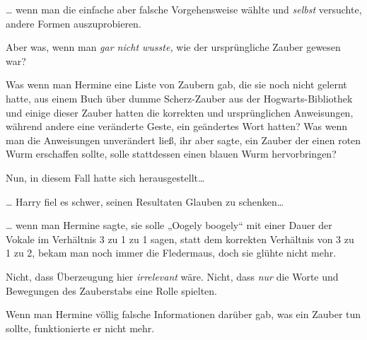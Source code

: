 … wenn man die einfache aber falsche Vorgehensweise wählte und \emph{selbst} versuchte, andere Formen auszuprobieren.

Aber was, wenn man \emph{gar nicht wusste,} wie der ursprüngliche Zauber gewesen war?

Was wenn man Hermine eine Liste von Zaubern gab, die sie noch nicht gelernt hatte, aus einem Buch über dumme Scherz-Zauber aus der Hogwarts-Bibliothek und einige dieser Zauber hatten die korrekten und ursprünglichen Anweisungen, während andere eine veränderte Geste, ein geändertes Wort hatten? Was wenn man die Anweisungen unverändert ließ, ihr aber sagte, ein Zauber der einen roten Wurm erschaffen sollte, solle stattdessen einen blauen Wurm hervorbringen?

Nun, in diesem Fall hatte sich herausgestellt…

… Harry fiel es schwer, seinen Resultaten Glauben zu schenken…

… wenn man Hermine sagte, sie solle „Oogely boogely“ mit einer Dauer der Vokale im Verhältnis 3 zu 1 zu 1 sagen, statt dem korrekten Verhältnis von 3 zu 1 zu 2, bekam man noch immer die Fledermaus, doch sie glühte nicht mehr.

Nicht, dass Überzeugung hier \emph{irrelevant} wäre. Nicht, dass \emph{nur} die Worte und Bewegungen des Zauberstabs eine Rolle spielten.

Wenn man Hermine völlig falsche Informationen darüber gab, was ein Zauber tun sollte, funktionierte er nicht mehr.

